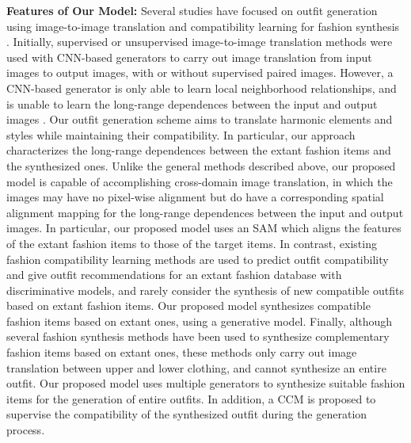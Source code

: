 \textbf{Features of Our Model:} Several studies have focused on outfit generation using image-to-image translation \cite{pix2pix2017,wang2018pix2pixHD,CycleGAN2017,huang2018munit,DRIT_plus,choi2020starganv2} and compatibility learning \cite{mcauley2015image,veit2015learning,vasileva2018learning,han2017learning,cui2019dressing,li2020hierarchical} for fashion synthesis \cite{attribute_gan,multi_dis_fashion,Yu_2019_ICCV}. Initially, supervised \cite{pix2pix2017,wang2018pix2pixHD} or unsupervised image-to-image translation methods \cite{CycleGAN2017,huang2018munit,DRIT_plus,choi2020starganv2} were used with CNN-based generators to carry out image translation from input images to output images, with or without supervised paired images. However, a CNN-based generator is only able to learn local neighborhood relationships, and is unable to learn the long-range dependences between the input and output images \cite{wang2018non}. Our outfit generation scheme aims to translate harmonic elements and styles while maintaining their compatibility. In particular, our approach characterizes the long-range dependences between the extant fashion items and the synthesized ones. Unlike the general methods described above, our proposed model is capable of accomplishing cross-domain image translation, in which the images may have no pixel-wise alignment but do have a corresponding spatial alignment mapping for the long-range dependences between the input and output images. In particular, our proposed model uses an SAM which aligns the features of the extant fashion items to those of the target items. In contrast, existing fashion compatibility learning methods \cite{mcauley2015image,veit2015learning,vasileva2018learning,han2017learning,cui2019dressing,li2020hierarchical} are used to predict outfit compatibility and give outfit recommendations for an extant fashion database with discriminative models, and rarely consider the synthesis of new compatible outfits based on extant fashion items. Our proposed model synthesizes compatible fashion items based on extant ones, using a generative model. Finally, although several fashion synthesis methods \cite{attribute_gan,multi_dis_fashion,Yu_2019_ICCV} have been used to synthesize complementary fashion items based on extant ones, these methods only carry out image translation between upper and lower clothing, and cannot synthesize an entire outfit. Our proposed model uses multiple generators to synthesize suitable fashion items for the generation of entire outfits. In addition, a CCM is proposed to supervise the compatibility of the synthesized outfit during the generation process.